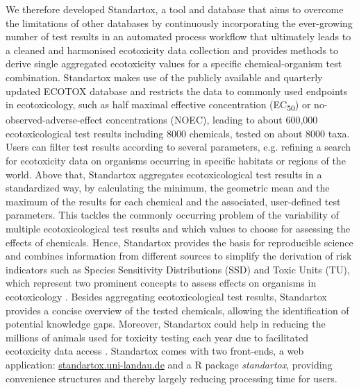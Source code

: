 We therefore developed Standartox, a tool and database that aims to overcome the limitations of other databases by continuously incorporating the ever-growing number of test results in an automated process workflow that ultimately leads to a cleaned and harmonised ecotoxicity data collection and provides methods to derive single aggregated ecotoxicity values for a specific chemical-organism test combination. Standartox makes use of the publicly available and quarterly updated ECOTOX database \citep{usepa_ecotox_2019} and restricts the data to commonly used endpoints in ecotoxicology, such as half maximal effective concentration (EC\textsubscript{50}) or no-observed-adverse-effect concentrations (NOEC), leading to about 600,000 ecotoxicological test results including 8000 chemicals, tested on about 8000 taxa. Users can filter test results according to several parameters, e.g. refining a search for ecotoxicity data on organisms occurring in specific habitats or regions of the world. Above that, Standartox aggregates ecotoxicological test results in a standardized way, by calculating the minimum, the geometric mean and the maximum of the results for each chemical and the associated, user-defined test parameters. This tackles the commonly occurring problem of the variability of multiple ecotoxicological test results and which values to choose for assessing the effects of chemicals. Hence, Standartox provides the basis for reproducible science and combines information from different sources to simplify the derivation of risk indicators such as Species Sensitivity Distributions (SSD) and Toxic Units (TU), which represent two prominent concepts to assess effects on organisms in ecotoxicology \citep{posthuma_species_2002, kefford_definition_2011, schafer_effects_2011}. Besides aggregating ecotoxicological test results, Standartox provides a concise overview of the tested chemicals, allowing the identification of potential knowledge gaps. Moreover, Standartox could help in reducing the millions of animals used for toxicity testing each year due to facilitated ecotoxicity data access \citep{hartung_chemical_2009}. Standartox comes with two front-ends, a web application: \url{standartox.uni-landau.de} and a R \citep{rcoreteam_language_2017} package \textit{standartox}, providing convenience structures and thereby largely reducing processing time for users.

